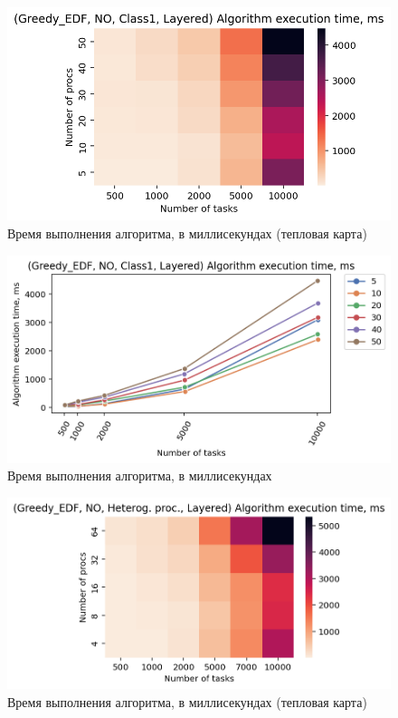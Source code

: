 \begin{figure}[!htbp]
    \centering
    \includegraphics[width=\textwidth]{imgs/layered_class_1/NO_EDF/et_heatmap.png}
    \caption{Время выполнения алгоритма, в миллисекундах (тепловая карта)}
    \label{fig:NO-layered-EDF-exec-time-heatmap}
\end{figure}

\begin{figure}[!htbp]
    \centering
    \includegraphics[width=\textwidth]{imgs/layered_class_1/NO_EDF/tr_graph.png}
    \caption{Время выполнения алгоритма, в миллисекундах}
    \label{fig:NO-layered-EDF-exec-time-compiled}
\end{figure}

\begin{figure}[!htbp]
    \centering
    \includegraphics[width=\textwidth]{imgs/unbalanced/NO_EDF/et_heatmap.png}
    \caption{Время выполнения алгоритма, в миллисекундах (тепловая карта)}
    \label{fig:NO-unbalanced-EDF-exec-time-heatmap}
\end{figure}

